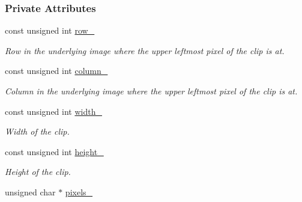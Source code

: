 \subsubsection*{Private Attributes}
\begin{CompactItemize}
\item 
\hypertarget{class_clip_0cd08f7e03723520abc92275edb576e2}{
const unsigned int \hyperlink{class_clip_0cd08f7e03723520abc92275edb576e2}{row\_\-}}
\label{class_clip_0cd08f7e03723520abc92275edb576e2}

\begin{CompactList}\small\item\em Row in the underlying image where the upper leftmost pixel of the clip is at. \item\end{CompactList}\item 
\hypertarget{class_clip_d9977cd397e167b9185bdeb0fda68120}{
const unsigned int \hyperlink{class_clip_d9977cd397e167b9185bdeb0fda68120}{column\_\-}}
\label{class_clip_d9977cd397e167b9185bdeb0fda68120}

\begin{CompactList}\small\item\em Column in the underlying image where the upper leftmost pixel of the clip is at. \item\end{CompactList}\item 
\hypertarget{class_clip_f8547b17e2ad42a17e39b25f7951faaa}{
const unsigned int \hyperlink{class_clip_f8547b17e2ad42a17e39b25f7951faaa}{width\_\-}}
\label{class_clip_f8547b17e2ad42a17e39b25f7951faaa}

\begin{CompactList}\small\item\em Width of the clip. \item\end{CompactList}\item 
\hypertarget{class_clip_35dd13977f3e15d04053260154ebf42e}{
const unsigned int \hyperlink{class_clip_35dd13977f3e15d04053260154ebf42e}{height\_\-}}
\label{class_clip_35dd13977f3e15d04053260154ebf42e}

\begin{CompactList}\small\item\em Height of the clip. \item\end{CompactList}\item 
\hypertarget{class_clip_e8dc6d41fb103eaafa9bc5963ab6d826}{
unsigned char $\ast$ \hyperlink{class_clip_e8dc6d41fb103eaafa9bc5963ab6d826}{pixels\_\-}}
\label{class_clip_e8dc6d41fb103eaafa9bc5963ab6d826}


\end{CompactItemize}
